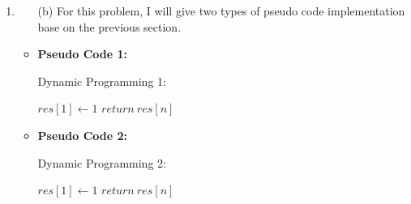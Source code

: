 \documentclass[12pt,a4paper]{article}
\makeatletter
\newtheorem*{solution}{Solution}
\theoremstyle{definition}
\renewenvironment{solution}[1][Solution] {\par\pushQED{\qed}\normalfont\topsep6\p@\@plus6\p@\relax\trivlist\item[\hskip\labelsep\bfseries#1\@addpunct{.}]\ignorespaces}{\popQED\endtrivlist\@endpefalse} \makeatother
\makeatother
\begin{document}
\begin{enumerate}
\begin{solution}
\begin{itemize}
        \item [(b)] For this problem, I will give two types of pseudo code implementation base on the previous section.

        \item
        \textbf{Pseudo Code 1:}
    
        \begin{minipage}[t]{0.8\textwidth}
        \begin{algorithm}[H]
        \BlankLine
        \caption{Dynamic Programming 1:}
        \label{ALG1}
        \BlankLine

        $res[1]\leftarrow 1$\;
        $return\ res[n] $\;

        \end{algorithm}
        \end{minipage}


        \item
        \textbf{Pseudo Code 2:}
    
        \begin{minipage}[t]{0.8\textwidth}
        \begin{algorithm}[H]
        \BlankLine
        \caption{Dynamic Programming 2:}
        \label{ALG2}
        \BlankLine  
        $res[1]\leftarrow 1$\;
        $return\ res[n] $\;


        \end{algorithm}
        \end{minipage}


    \end{itemize}

    \end{solution}


\end{enumerate}
\end{document}
